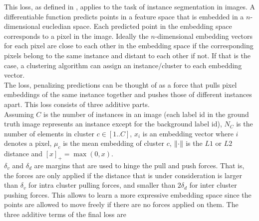 This loss, as defined in \cite{brab2017semantic}, applies to the task of instance segmentation in images. A differentiable function predicts points in a feature space that is embedded in a $n$-dimensional eucledian space. Each predicted point in the embedding space corresponds to a pixel in the image. Ideally the $n$-dimensional embedding vectors for each pixel are close to each other in the embedding space if the corresponding pixels belong to the same instance and distant to each other if not. If that is the case, a clustering algorithm can assign an instance/cluster to each embedding vector.\\
The loss, penalizing predictions can be thought of as a force that pulls pixel embeddings of the same instance together and pushes those of different instances apart.
This loss consists of three additive parts.\\ Assuming $C$ is the number of instances in an image (each label id in the ground truth image represents an instance except for the background label id), $N_C$ is the number of elements in cluster $c \in [1..C]$, $x_i$ is an embedding vector where $i$ denotes a pixel, $\mu_c$ is the mean embedding of cluster $c$, $\left\lVert\cdot\right\rVert$ is the $L1$ or $L2$ distance and $[x]_+ = \max(0, x)$.\\
$\delta_v$ and $\delta_d$ are margins that are used to hinge the pull and push forces. That is, the forces are only applied if the distance that is under consideration is larger than $\delta_v$ for intra cluster pulling forces, and smaller than $2\delta_d$ for inter cluster pushing forces. This allows to learn a more expressive embedding space since the points are allowed to move freely if there are no forces applied on them. The three additive terms of the final loss are\\

